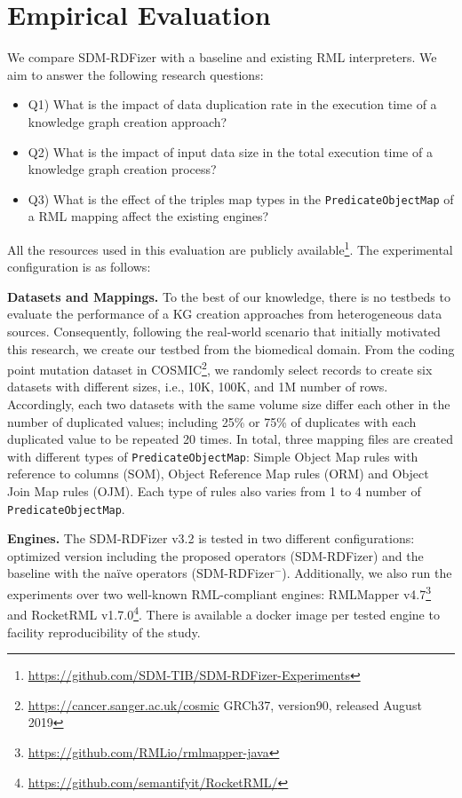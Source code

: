 \section{Empirical Evaluation}
\label{sec:eval}
We compare SDM-RDFizer with a baseline and existing RML interpreters. We aim to answer the following research questions:
\begin{itemize}
\item Q1) What is the impact of data duplication rate in the execution time of a knowledge graph creation approach?
\item Q2) What is the impact of input data size in the total execution time of a knowledge graph creation process?
\item Q3) What is the effect of the triples map types in the \verb|PredicateObjectMap| of a RML mapping affect the existing engines?
\end{itemize}
All the resources used in this evaluation are publicly available\footnote{\url{https://github.com/SDM-TIB/SDM-RDFizer-Experiments}}. The experimental configuration is as follows:

\noindent\textbf{Datasets and Mappings.} To the best of our knowledge, there is no testbeds to evaluate the performance of a KG creation approaches from heterogeneous data sources. Consequently, following the real-world scenario that initially motivated this research, we create our testbed from the biomedical domain. From the coding point mutation dataset in COSMIC\footnote{\url{https://cancer.sanger.ac.uk/cosmic} GRCh37, version90, released August 2019}, we randomly select records to create six datasets with different sizes, i.e., 10K, 100K, and 1M number of rows. Accordingly, each two datasets with the same volume size differ each other in the number of duplicated values; including 25\% or 75\% of duplicates with each duplicated value to be repeated 20 times. In total, three mapping files are created with different types of \verb|PredicateObjectMap|: Simple Object Map rules with reference to columns (SOM), Object Reference Map rules (ORM) and Object Join Map rules (OJM). Each type of rules also varies from 1 to 4 number of \verb|PredicateObjectMap|.

\noindent\textbf{Engines.} The SDM-RDFizer v3.2 is tested in two different configurations: optimized version including the proposed operators (SDM-RDFizer) and the baseline with the na\"ive operators (SDM-RDFizer$^-$). Additionally, we also run the experiments over two well-known RML-compliant engines: RMLMapper v4.7\footnote{\url{https://github.com/RMLio/rmlmapper-java}} and RocketRML v1.7.0\footnote{\url{https://github.com/semantifyit/RocketRML/}}. There is available a docker image per tested engine to facility reproducibility of the study.

